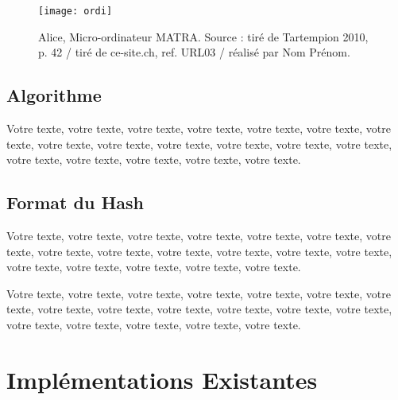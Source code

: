 \begin{figure}[tbph!]
	\centering
	\texttt{[image: ordi]}
	\caption[Alice, Micro-ordinateur MATRA.]{Alice, Micro-ordinateur MATRA. Source : tiré de Tartempion 2010, p. 42 / tiré de ce-site.ch, ref. URL03 / réalisé par Nom Prénom.}
	\label{fig:image}
\end{figure}


\subsection{Algorithme}

Votre texte, votre texte, votre texte, votre texte, votre texte, votre texte, votre texte, votre texte, votre texte, votre texte, votre texte, votre texte, votre texte, votre texte, votre texte, votre texte, votre texte, votre texte.


\subsection{Format du Hash}

Votre texte, votre texte, votre texte, votre texte, votre texte, votre texte, votre texte, votre texte, votre texte, votre texte, votre texte, votre texte, votre texte, votre texte, votre texte, votre texte, votre texte, votre texte.

\begin{table}[tbph!]
\end{table}

Votre texte, votre texte, votre texte, votre texte, votre texte, votre texte, votre texte, votre texte, votre texte, votre texte, votre texte, votre texte, votre texte, votre texte, votre texte, votre texte, votre texte, votre texte.

\section{Implémentations Existantes}